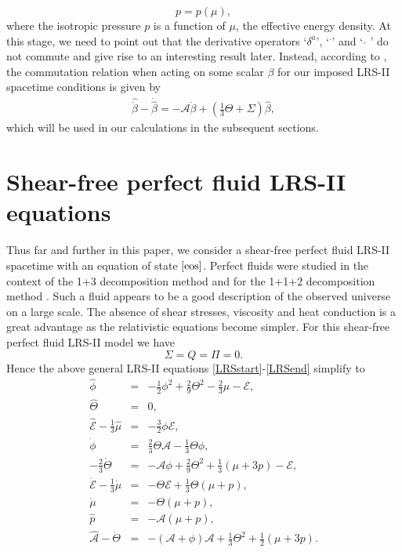 \documentclass[abstract=on,notitlepage,superscriptaddress,nofootinbib,aps,preprint,prd]{revtex4}
\newcommand{\0}{^{(0)}}
\newcommand{\1}{^{(1)}}
\newcommand{\2}{^{(2)}}
\newcommand{\3}{{}^{(3)}}
\begin{document}
 \begin{equation}
 p=p(\mu), \label{eos}
 \end{equation}
 where the isotropic pressure $p$ is a function of $\mu$, the effective energy density. At this stage, we need to point out that the derivative operators `$\delta^a$', `${^\cdot{}}$' and ` $\hat{}$ ' do not commute and give rise to an interesting result later. Instead, according to \cite{clarkson2007}, the commutation relation when acting on some scalar $\beta$ for our imposed LRS-II spacetime conditions is given by 
\begin{align}
     \hat{\dot{\beta}}-\dot{\hat{\beta}}=-\mathcal{A}\dot{\beta}+
     \left(\frac{1}{3}\Theta+\Sigma\right)\hat{\beta},\label{comm_reln}
\end{align}
which will be used in our calculations in the subsequent sections.



\section{Shear-free perfect fluid LRS-II  equations}
Thus far and further in this paper, we consider a shear-free  perfect fluid LRS-II  spacetime with an equation of state $\eqref{eos}$. Perfect fluids were studied in the context of the 1+3 decomposition method \cite{vanElstEllis} and for the 1+1+2 decomposition method \cite{clarkson2007}. Such a fluid appears to be a good description of the observed universe on a large scale. The absence of  shear stresses, viscosity and heat conduction is a great advantage as the relativistic equations become simpler. For this shear-free  perfect fluid LRS-II model we have
\begin{equation}
\Sigma=Q=\Pi=0. \label{conditions}
\end{equation} 
Hence the above general LRS-II equations \eqref{LRSstart}-\eqref{LRSend} simplify to
\begin{eqnarray}
	\hat{\phi} &=& -\frac{1}{2}\phi^2+\frac{2}{9}\Theta^2-\frac{2}{3}\mu-\mathcal{E},\label{A1}\\	
	\hat{\Theta} &=& 0,\label{B1}\\	
	\hat{\mathcal{E}}-\frac{1}{3}\hat{\mu}&=&-\frac{3}{2}\phi\mathcal{E},\label{C1}\\	
	\dot{\phi}&=&\frac{2}{3}\Theta\mathcal{A}-\frac{1}{3}\Theta\phi,\label{D1}\\	
	-\frac{2}{3}\dot{\Theta}&=&-\mathcal{A}\phi+\frac{2}{9}\Theta^2+\frac{1}{3}(\mu+3p)-\mathcal{E},\label{E1} \\	
	\dot{\mathcal{E}}-\frac{1}{3}\dot{\mu}&=&-\Theta\mathcal{E}+\frac{1}{3}\Theta(\mu+p),\label{F1}\\	
	\dot{\mu} &=& -\Theta(\mu+p),\label{G1}\\	
	\hat{p} &=&-\mathcal{A}(\mu+p),\label{H1}\\	
	\hat{\mathcal{A}}-\dot{\Theta}&=&-(\mathcal{A}+\phi)\mathcal{A}+\frac{1}{3}\Theta^2+\frac{1}{2}(\mu+3p)\label{I1}.
\end{eqnarray}
\end{document}
